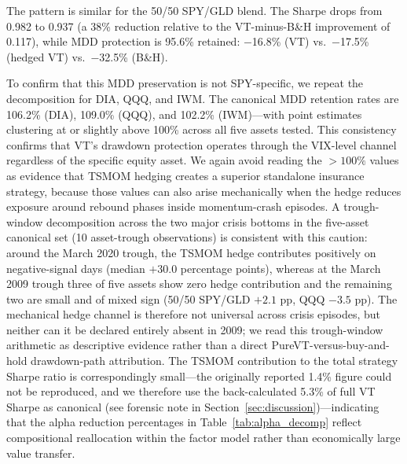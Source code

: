 The pattern is similar for the 50/50 SPY/GLD blend. The Sharpe drops from 0.982 to 0.937 (a 38\% reduction relative to the VT-minus-B\&H improvement of 0.117), while MDD protection is 95.6\% retained: $-$16.8\% (VT) vs.\ $-$17.5\% (hedged VT) vs.\ $-$32.5\% (B\&H).

To confirm that this MDD preservation is not SPY-specific, we repeat the decomposition for DIA, QQQ, and IWM. The canonical MDD retention rates are 106.2\% (DIA), 109.0\% (QQQ), and 102.2\% (IWM)---with point estimates clustering at or slightly above 100\% across all five assets tested. This consistency confirms that VT's drawdown protection operates through the VIX-level channel regardless of the specific equity asset. We again avoid reading the $>100\%$ values as evidence that TSMOM hedging creates a superior standalone insurance strategy, because those values can also arise mechanically when the hedge reduces exposure around rebound phases inside momentum-crash episodes. A trough-window decomposition across the two major crisis bottoms in the five-asset canonical set (10 asset-trough observations) is consistent with this caution: around the March 2020 trough, the TSMOM hedge contributes positively on negative-signal days (median $+30.0$ percentage points), whereas at the March 2009 trough three of five assets show zero hedge contribution and the remaining two are small and of mixed sign (50/50 SPY/GLD $+2.1$ pp, QQQ $-3.5$ pp). The mechanical hedge channel is therefore not universal across crisis episodes, but neither can it be declared entirely absent in 2009; we read this trough-window arithmetic as descriptive evidence rather than a direct PureVT-versus-buy-and-hold drawdown-path attribution. The TSMOM contribution to the total strategy Sharpe ratio is correspondingly small---the originally reported 1.4\% figure could not be reproduced, and we therefore use the back-calculated 5.3\% of full VT Sharpe as canonical (see forensic note in Section~\ref{sec:discussion})---indicating that the alpha reduction percentages in Table~\ref{tab:alpha_decomp} reflect compositional reallocation within the factor model rather than economically large value transfer.

